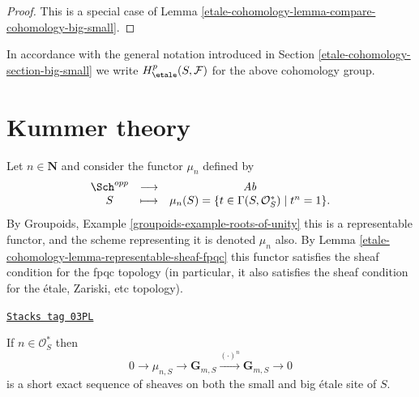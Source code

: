 \begin{proof}
This is a special case of Lemma \ref{etale-cohomology-lemma-compare-cohomology-big-small}.
\end{proof}

In accordance with the general notation introduced in
Section \ref{etale-cohomology-section-big-small}
we write $H_\etale^p(S, \mathcal{F})$ for the above cohomology group.



\section{Kummer theory}
\label{etale-cohomology-section-kummer}
Let $n \in \mathbf{N}$ and consider the functor $\mu_n$ defined by
$$
\begin{matrix}
\Sch^{opp} & \longrightarrow & \textit{Ab} \\
S & \longmapsto &
\mu_n(S)
=
\{t \in \Gamma(S, \mathcal{O}_S^*) \mid t^n = 1 \}.
\end{matrix}
$$
By
Groupoids, Example \ref{groupoids-example-roots-of-unity}
this is a representable functor, and the scheme representing it
is denoted $\mu_n$ also. By
Lemma \ref{etale-cohomology-lemma-representable-sheaf-fpqc}
this functor satisfies the sheaf condition for the fpqc topology
(in particular, it also satisfies the sheaf condition for the
\'etale, Zariski, etc topology).

\begin{lemma}
\label{etale-cohomology-lemma-kummer-sequence}
\href{https://stacks.math.columbia.edu/tag/03PL}{\texttt{Stacks tag 03PL}}

If $n\in \mathcal{O}_S^*$ then
$$
0 \to
\mu_{n, S} \to
\mathbf{G}_{m, S} \xrightarrow{(\cdot)^n}
\mathbf{G}_{m, S} \to 0
$$
is a short exact sequence of sheaves on both the small and
big \'etale site of $S$.
\end{lemma}

